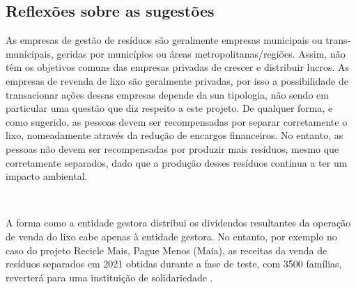 \documentclass[11pt, a4paper, oneside]{book}
\begin{document}
\begin{appendices}
\begin{mdframed}[innerleftmargin=7.5mm, innerrightmargin=7.5mm, innertopmargin=7.5mm, innerbottommargin=7.5mm]
\end{mdframed}

\subsection{Reflexões sobre as sugestões}

\noindent{}

As empresas de gestão de resíduos são geralmente empresas municipais ou trans-municipais, geridas por municípios ou áreas metropolitanas/regiões. Assim, não têm os objetivos comuns das empresas privadas de crescer e distribuir lucros. As empresas de revenda de lixo são geralmente privadas, por isso a possibilidade de transacionar ações dessas empresas depende da sua tipologia, não sendo em particular uma questão que diz respeito a este projeto. De qualquer forma, e como sugerido, as pessoas devem ser recompensadas por separar corretamente o lixo, nomeadamente através da redução de encargos financeiros. No entanto, as pessoas não devem ser recompensadas por produzir mais resíduos, mesmo que corretamente separados, dado que a produção desses resíduos continua a ter um impacto ambiental.

~

\noindent{}

A forma como a entidade gestora distribui os dividendos resultantes da operação de venda do lixo cabe apenas à entidade gestora. No entanto, por exemplo no caso do projeto Recicle Mais, Pague Menos (Maia), as receitas da venda de resíduos separados em 2021 obtidas durante a fase de teste, com 3500 famílias, reverterá para uma instituição de solidariedade \cite{rmpm-noticiasmaia}.

~

\noindent{}


\noindent{}


\end{appendices}
\end{document}
